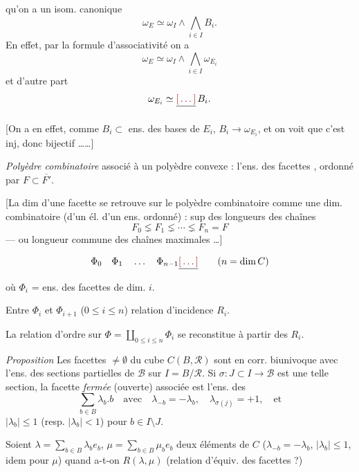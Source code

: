 \documentclass[11pt,a4paper]{article}
\begin{document}
 qu'on a un isom. canonique
\[
  \omega_E \simeq \omega_I \wedge \bigwedge_{i\in I} B_i .
\]
En effet, par la formule d'associativité on a
\[
  \omega_E \simeq \omega_I \wedge \bigwedge_{i\in I} \omega_{E_i}
\]
et d'autre part
\[
  \omega_{E_i} \simeq \struck{\ill{}}\, B_i .
\]

[On a en effet, comme $B_i \subset$
ens. des bases  de $E_i$, $B_i \to \omega_{E_i}$, et on voit que c'est inj,
donc bijectif ……]



\emph{Polyèdre combinatoire} associé à un polyèdre convexe : l'ens. des
facettes , \struck{\ill{}} ordonné par $F \subset \overline{F'}$.

[La dim d'une facette se retrouve sur le polyèdre combinatoire comme une dim.
combinatoire (d'un él. d'un ens. ordonné) : sup des longueurs des chaînes
\[
  F_0 \lneq F_1 \lneq \cdots \lneq F_n = F
\]
— ou longueur commune des chaînes maximales …]

\[
  \Phi_0 \quad \Phi_1 \quad \ldots \quad \Phi_{n-1}\struck{\ill{}}
  \qquad (n = \dim C)
\]
où $\Phi_i$ = ens. des facettes de dim. $i$.

Entre $\Phi_i$ et $\Phi_{i+1}$ ($0 \leq i \leq n$) relation d'incidence $R_i$.

La relation d'ordre sur $\Phi = \coprod_{0\leq i\leq n} \Phi_i$ se reconstitue à
partir des $R_i$.

\emph{Proposition} Les facettes $\neq \emptyset$ du \struck{\ill{}} cube
$C(B,\mathcal{R})$ sont en corr. biunivoque avec l'ens. des sections
partielles de $\mathcal{B}$ sur $I = B/\mathcal{R}$. Si
$\sigma : J \subset I \to \mathcal{B}$ est une telle section, la facette
\emph{fermée} (ouverte) associée est l'ens. des
\[
  \sum_{b\in B} \lambda_b . b \quad \text{avec} \quad
  \lambda_{-b} = -\lambda_b, \quad \lambda_{\sigma(j)} = +1, \quad \text{et}
\]
$|\lambda_b| \leq 1$ (resp. $|\lambda_b| < 1$) pour $b \in I \setminus J$.


Soient $\lambda = \sum_{b\in B} \lambda_b e_b$, $\mu = \sum_{b\in B} \mu_b e_b$
deux éléments de $C$ ($\lambda_{-b} = -\lambda_b$, $|\lambda_b| \leq 1$, idem
pour $\mu$) quand a-t-on $R(\lambda,\mu)$ (relation d'équiv. des facettes ?)
\end{document}
